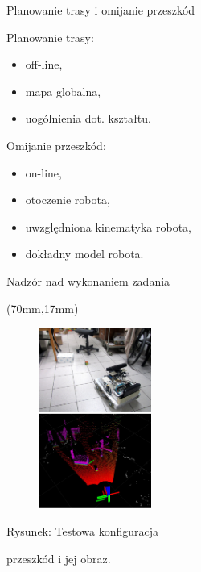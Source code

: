 \documentclass[xcolor=x11names,compress]{beamer}
\renewcommand{\(}{\begin{columns}}
\renewcommand{\)}{\end{columns}}
\newcommand{\<}[1]{\begin{column}{#1}}
\renewcommand{\>}{\end{column}}
\begin{document}
\begin{frame}{Planowanie trasy i omijanie przeszkód}

\alert{Planowanie trasy:}
\begin{itemize}
\item off-line,
\item mapa globalna,
\item uogólnienia dot. kształtu.
\end{itemize}

\vspace{.3cm}

\alert{Omijanie przeszkód:}
\begin{itemize}
\item on-line,
\item otoczenie robota,
\item uwzględniona kinematyka robota,
\item dokładny model robota.
\end{itemize}

\vspace{.3cm}

\alert{Nadzór nad wykonaniem zadania}

\begin{textblock*}{70mm}(70mm,17mm)%
    \begin{minipage}[l]{70mm}%

	\begin{figure}[h!]
	\centering
	\includegraphics[width=3.7cm]{../Common/img/cloud}
	\end{figure}

	\hspace{1.5cm}\scriptsize \alert{Rysunek:} Testowa konfiguracja

	\hspace{1.5cm}przeszkód i jej obraz.
    \end{minipage}
\end{textblock*}

\end{frame}
\end{document}
